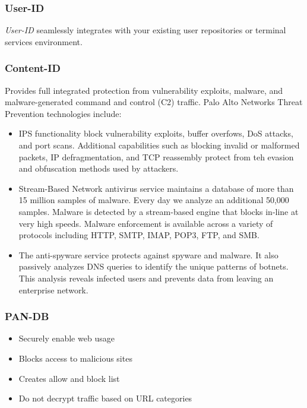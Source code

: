 \subsubsection{User-ID}
\textit{User-ID} seamlessly integrates with your existing user repositories or terminal services environment. 

\subsubsection{Content-ID}
Provides full integrated protection from vulnerability exploits, malware, and malware-generated command and control (C2) traffic. Palo Alto Networks Threat Prevention technologies include:
\begin{itemize}
    \item IPS functionality block vulnerability exploits, buffer overfows, DoS attacks, and port scans. 
    Additional capabilities such as blocking invalid or malformed packets, IP defragmentation, and TCP reassembly protect from teh evasion and obfuscation methods used by attackers.
    \item Stream-Based Network antivirus service maintains a database of more than 15 million samples of malware. Every day we analyze an additional 50,000 samples.
    Malware is detected by a stream-based engine that blocks in-line at very high speeds. 
    Malware enforcement is available across a variety of protocols including HTTP, SMTP, IMAP, POP3, FTP, and SMB.
    \item The anti-spyware service protects against spyware and malware. 
    It also passively analyzes DNS queries to identify the unique patterns of botnets.
    This analysis reveals infected users and prevents data from leaving an enterprise network.
    
\end{itemize}

\subsubsection{PAN-DB}
\begin{itemize}
    \item Securely enable web usage
    \item Blocks access to malicious sites
    \item Creates allow and block list
    \item Do not decrypt traffic based on URL categories
\end{itemize}

